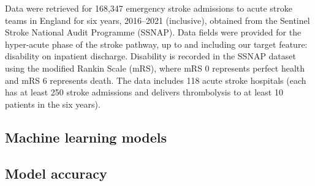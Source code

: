 Data were retrieved for 168,347 emergency stroke admissions to acute stroke teams in England for six years, 2016–2021 (inclusive), obtained from the Sentinel Stroke National Audit Programme (SSNAP). Data fields were provided for the hyper-acute phase of the stroke pathway, up to and including our target feature: disability on inpatient discharge. Disability is recorded in the SSNAP dataset using the modified Rankin Scale (mRS), where mRS 0 represents perfect health and mRS 6 represents death. The data includes 118 acute stroke hospitals (each has at least 250 stroke admissions and delivers thrombolysis to at least 10 patients in the six years).

\subsection{Machine learning models}

\subsection{Model accuracy}

